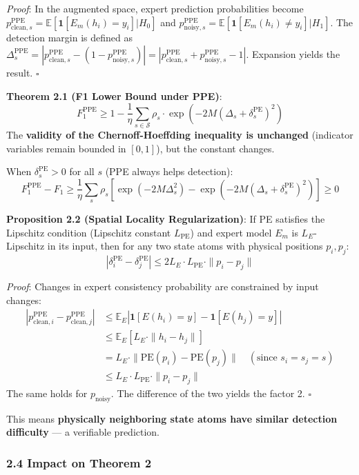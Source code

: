 \documentclass[
  12pt,
]{article}
\begin{document}
\emph{Proof}: In the augmented space, expert prediction probabilities become $p_{\text{clean},s}^{\text{PPE}} = \mathbb{E}[\mathbf{1}[E_m(h_i) = y_i] | H_0]$ and $p_{\text{noisy},s}^{\text{PPE}} = \mathbb{E}[\mathbf{1}[E_m(h_i) \neq y_i] | H_1]$. The detection margin is defined as $\Delta_s^{\text{PPE}} = |p_{\text{clean},s}^{\text{PPE}} - (1 - p_{\text{noisy},s}^{\text{PPE}})| = |p_{\text{clean},s}^{\text{PPE}} + p_{\text{noisy},s}^{\text{PPE}} - 1|$. Expansion yields the result. $\square$

\textbf{Theorem 2.1 (F1 Lower Bound under PPE)}:
\[\boxed{F_1^{\text{PPE}} \geq 1 - \frac{1}{\eta} \sum_{s \in \mathcal{S}} \rho_s \cdot \exp\left(-2M (\Delta_s + \delta_s^{\text{PE}})^2\right)}\]
The \textbf{validity of the Chernoff-Hoeffding inequality is unchanged} (indicator variables remain bounded in $[0,1]$), but the constant changes.

When $\delta_s^{\text{PE}} > 0$ for all $s$ (PPE always helps detection):
\[F_1^{\text{PPE}} - F_1 \geq \frac{1}{\eta} \sum_s \rho_s \left[\exp(-2M\Delta_s^2) - \exp(-2M(\Delta_s + \delta_s^{\text{PE}})^2)\right] \geq 0\]

\textbf{Proposition 2.2 (Spatial Locality Regularization)}: If PE satisfies the Lipschitz condition (Lipschitz constant $L_{\text{PE}}$) and expert model $E_m$ is $L_E$-Lipschitz in its input, then for any two state atoms with physical positions $p_i, p_j$:
\[|\delta_i^{\text{PE}} - \delta_j^{\text{PE}}| \leq 2L_E \cdot L_{\text{PE}} \cdot \|p_i - p_j\|\]

\emph{Proof}: Changes in expert consistency probability are constrained by input changes:
\begin{align*}
|p_{\text{clean},i}^{\text{PPE}} - p_{\text{clean},j}^{\text{PPE}}|
&\leq \mathbb{E}_{E} \left|\mathbf{1}[E(h_i) = y] - \mathbf{1}[E(h_j) = y]\right| \\
&\leq \mathbb{E}_{E} \left[ L_E \cdot \|h_i - h_j\| \right] \\
&= L_E \cdot \|\text{PE}(p_i) - \text{PE}(p_j)\| \quad (\text{since } s_i = s_j = s) \\
&\leq L_E \cdot L_{\text{PE}} \cdot \|p_i - p_j\|
\end{align*}
The same holds for $p_{\text{noisy}}$. The difference of the two yields the factor 2. $\square$

This means \textbf{physically neighboring state atoms have similar detection difficulty} --- a verifiable prediction.

\subsubsection{2.4 Impact on Theorem 2}\label{impact-on-theorem-2}
\end{document}
